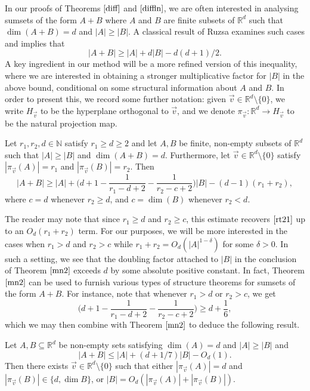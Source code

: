 In our proofs of Theorems $\ref{diff}$ and $\ref{diffln}$, we are often interested in analysing sumsets of the form $A+B$ where $A$ and $B$ are finite subsets of $\mathbb{R}^d$ such that $\dim(A+B) = d$ and $|A| \geq |B|$. A classical result of Ruzsa \cite{Ru1994} examines such cases and implies that 
\begin{equation} \label{rt21}
 |A+B| \geq |A| + d |B|  - d(d+1)/2.
 \end{equation}
A key ingredient in our method will be a more refined version of this inequality, where we are interested in obtaining a stronger multiplicative factor for $|B|$ in the above bound, conditional on some structural information about $A$ and $B$. In order to present this, we record some further notation: given $\vec{v} \in \mathbb{R}^d \setminus \{0\}$, we write $H_{\vec{v}}$ to be the hyperplane orthogonal to $\vec{v}$, and we denote $\pi_{\vec{v}} : \mathbb{R}^d \to H_{\vec{v}}$ to be the natural projection map. 


\begin{theorem} \label{mn2}
Let $r_1, r_2, d\in \mathbb{N}$ satisfy $r_1 \geq d\geq 2$ and let $A,B$ be finite, non-empty subsets of $\mathbb{R}^d$ such that $|A| \geq |B|$ and $\dim(A+B) = d$. Furthermore, let $\vec{v} \in \mathbb{R}^d \setminus \{0\}$ satisfy $|\pi_{\vec{v}}(A)| = r_1$ and $|\pi_{\vec{v}}(B)| = r_2$. Then
\[ |A+B| \geq |A| + \bigg(d+1 - \frac{1}{r_1 -d +2} - \frac{1}{r_2 - c + 2}\bigg)|B| - (d-1)(r_1 + r_2), \]
where $c = d$ whenever $r_2 \geq d$, and $c = \dim(B)$ whenever $r_2 < d$. 
\end{theorem}

The reader may note that since $r_1 \geq d$ and $r_2 \geq c$, this estimate recovers $\eqref{rt21}$ up to an $O_{d}(r_1 + r_2)$ term. For our purposes, we will be more interested in the cases when $r_1 > d$ and $r_2 > c$ while $r_1 + r_2 = O_d( |A|^{1- \delta})$ for some $\delta >0$. In such a setting, we see that the doubling factor attached to $|B|$ in the conclusion of Theorem $\ref{mn2}$ exceeds $d$ by some absolute positive constant. In fact, Theorem $\ref{mn2}$ can be used to furnish various types of structure theorems for sumsets of the form $A+B$. For instance, note that whenever $r_1 > d$ or $r_2 > c$, we get
\[  \bigg(d+1 - \frac{1}{r_1 -d +2} - \frac{1}{r_2 - c + 2}\bigg) \geq d+\frac{1}{6}, \]
which we may then combine with Theorem $\ref{mn2}$ to deduce the following result.

\begin{Corollary} \label{rnd2}
Let $A, B \subseteq \mathbb{R}^d$ be non-empty sets satisfying $\dim(A) = d$ and $|A| \geq |B|$ and
\begin{equation} \label{hyp8}
|A+B| \leq |A| + (d + 1/7)|B| - O_d(1). 
\end{equation}
Then there exists $\vec{v} \in \mathbb{R}^d \setminus \{0\}$ such that either $|\pi_{\vec{v}}(A)| = d$ and $|\pi_{\vec{v}}(B)| \in \{d, \dim B\}$, or $|B| = O_{d}(|\pi_{\vec{v}}(A)|  + |\pi_{\vec{v}}(B)|) $. 
\end{Corollary}


